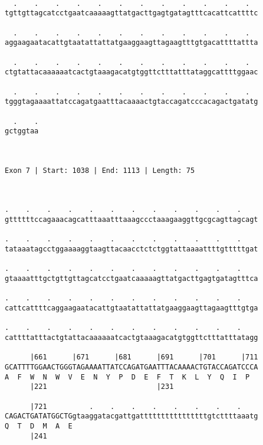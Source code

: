 \documentclass{article}
\begin{document}
\begin{Verbatim}
  
  .    .    .    .    .    .    .    .    .    .    .    .  
tgttgttagcatcctgaatcaaaaagttatgacttgagtgatagtttcacattcattttc
                                                            
  .    .    .    .    .    .    .    .    .    .    .    .  
aggaagaatacattgtaatattattatgaaggaagttagaagtttgtgacattttattta
                                                            
  .    .    .    .    .    .    .    .    .    .    .    .  
ctgtattacaaaaaatcactgtaaagacatgtggttctttatttataggcattttggaac
                                                            
  .    .    .    .    .    .    .    .    .    .    .    .  
tgggtagaaaattatccagatgaatttacaaaactgtaccagatcccacagactgatatg
                                                            
  .    .
gctggtaa
        
        
 
Exon 7 | Start: 1038 | End: 1113 | Length: 75



.    .    .    .    .    .    .    .    .    .    .    .    
gttttttccagaaacagcatttaaatttaaagccctaaagaaggttgcgcagttagcagt
                                                            
.    .    .    .    .    .    .    .    .    .    .    .    
tataaatagcctggaaaaggtaagttacaacctctctggtattaaaattttgtttttgat
                                                            
.    .    .    .    .    .    .    .    .    .    .    .    
gtaaaatttgctgttgttagcatcctgaatcaaaaagttatgacttgagtgatagtttca
                                                            
.    .    .    .    .    .    .    .    .    .    .    .    
cattcattttcaggaagaatacattgtaatattattatgaaggaagttagaagtttgtga
                                                            
.    .    .    .    .    .    .    .    .    .    .    .    
cattttatttactgtattacaaaaaatcactgtaaagacatgtggttctttatttatagg
                                                            
      |661      |671      |681      |691      |701      |711
GCATTTTGGAACTGGGTAGAAAATTATCCAGATGAATTTACAAAACTGTACCAGATCCCA
A  F  W  N  W  V  E  N  Y  P  D  E  F  T  K  L  Y  Q  I  P  
      |221                          |231                    
  
      |721          .    .    .    .    .    .    .    .    
CAGACTGATATGGCTGgtaaggatacgattgattttttttttttttttgtcttttaaatg
Q  T  D  M  A  E                                            
      |241                                                  
  

\end{Verbatim}
\end{document}
